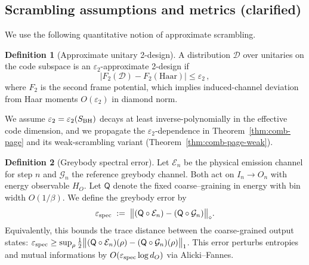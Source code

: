 \documentclass[a4paper,11pt]{article}
\theoremstyle{plain}
\theoremstyle{definition}
\newtheorem{definition}{Definition}
\theoremstyle{remark}
\begin{document}
\subsection*{Scrambling assumptions and metrics (clarified)}
We use the following quantitative notion of approximate scrambling.
\begin{definition}[Approximate unitary 2-design]\label{def:approx-2design}
  A distribution $\mathcal{D}$ over unitaries on the code subspace is an $\varepsilon_2$-approximate 2-design if
  \[
    \big|F_2(\mathcal{D})-F_2(\mathrm{Haar})\big|\le \varepsilon_2\,,
  \]
  where $F_2$ is the second frame potential, which implies induced-channel deviation from Haar moments $O(\varepsilon_2)$ in diamond norm.
\end{definition}
We assume $\varepsilon_2=\varepsilon_2(S_{\rm BH})$ decays at least inverse-polynomially in the effective code dimension,
and we propagate the $\varepsilon_2$-dependence in Theorem~\ref{thm:comb-page} and its weak-scrambling variant (Theorem~\ref{thm:comb-page-weak}).

\begin{definition}[Greybody spectral error]
Let $\mathcal{E}_n$ be the physical emission channel for step $n$ and $\mathcal{G}_n$ the reference greybody channel. Both act on $I_n\to O_n$ with energy observable $H_O$. Let $\mathsf{Q}$ denote the fixed coarse--graining in energy with bin width $O(1/\beta)$.
We define the greybody error by
\[ \varepsilon_{\rm spec}\;:=\;\big\| (\mathsf{Q}\circ \mathcal{E}_n) - (\mathsf{Q}\circ \mathcal{G}_n)\big\|_\diamond. \]
Equivalently, this bounds the trace distance between the coarse-grained output states: $\varepsilon_{\rm spec} \ge \sup_{\rho}\tfrac12\big\|(\mathsf{Q}\circ\mathcal{E}_n)(\rho) - (\mathsf{Q}\circ\mathcal{G}_n)(\rho)\big\|_1$. This error perturbs entropies and mutual informations by $O(\varepsilon_{\rm spec}\log d_O)$ via Alicki--Fannes.
\end{definition}
\end{document}
